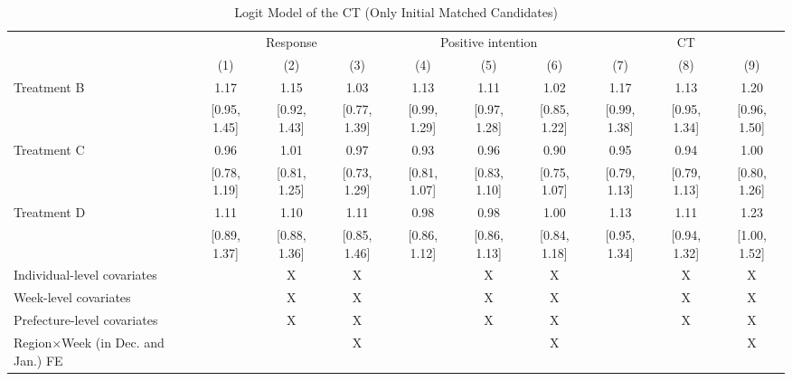 \documentclass[12pt, a4paper]{article}
\begin{document}
\begin{landscape}\begin{table}[H]

\caption{\label{tab:logit-reply-test-initial-matched}Logit Model of the CT (Only Initial Matched Candidates)}
\centering
\fontsize{8}{10}\selectfont
\begin{threeparttable}
\begin{tabular}[t]{lccccccccc}
\toprule
\multicolumn{1}{c}{ } & \multicolumn{3}{c}{Response} & \multicolumn{3}{c}{Positive intention} & \multicolumn{3}{c}{CT} \\
\cmidrule(l{3pt}r{3pt}){2-4} \cmidrule(l{3pt}r{3pt}){5-7} \cmidrule(l{3pt}r{3pt}){8-10}
  & (1) & (2) & (3) & (4) & (5) & (6) & (7) & (8) & (9)\\
\midrule
Treatment B & \num{1.17} & \num{1.15} & \num{1.03} & \num{1.13} & \num{1.11} & \num{1.02} & \num{1.17} & \num{1.13} & \num{1.20}\\
 & {}[\num{0.95}, \num{1.45}] & {}[\num{0.92}, \num{1.43}] & {}[\num{0.77}, \num{1.39}] & {}[\num{0.99}, \num{1.29}] & {}[\num{0.97}, \num{1.28}] & {}[\num{0.85}, \num{1.22}] & {}[\num{0.99}, \num{1.38}] & {}[\num{0.95}, \num{1.34}] & {}[\num{0.96}, \num{1.50}]\\
Treatment C & \num{0.96} & \num{1.01} & \num{0.97} & \num{0.93} & \num{0.96} & \num{0.90} & \num{0.95} & \num{0.94} & \num{1.00}\\
 & {}[\num{0.78}, \num{1.19}] & {}[\num{0.81}, \num{1.25}] & {}[\num{0.73}, \num{1.29}] & {}[\num{0.81}, \num{1.07}] & {}[\num{0.83}, \num{1.10}] & {}[\num{0.75}, \num{1.07}] & {}[\num{0.79}, \num{1.13}] & {}[\num{0.79}, \num{1.13}] & {}[\num{0.80}, \num{1.26}]\\
Treatment D & \num{1.11} & \num{1.10} & \num{1.11} & \num{0.98} & \num{0.98} & \num{1.00} & \num{1.13} & \num{1.11} & \num{1.23}\\
 & {}[\num{0.89}, \num{1.37}] & {}[\num{0.88}, \num{1.36}] & {}[\num{0.85}, \num{1.46}] & {}[\num{0.86}, \num{1.12}] & {}[\num{0.86}, \num{1.13}] & {}[\num{0.84}, \num{1.18}] & {}[\num{0.95}, \num{1.34}] & {}[\num{0.94}, \num{1.32}] & {}[\num{1.00}, \num{1.52}]\\
\midrule
Individual-level covariates &  & X & X &  & X & X &  & X & X\\
Week-level covariates &  & X & X &  & X & X &  & X & X\\
Prefecture-level covariates &  & X & X &  & X & X &  & X & X\\
Region$\times$Week (in Dec. and Jan.) FE &  &  & X &  &  & X &  &  & X\\

\end{tabular}
\end{threeparttable}
\end{table}
\end{landscape}
\end{document}
